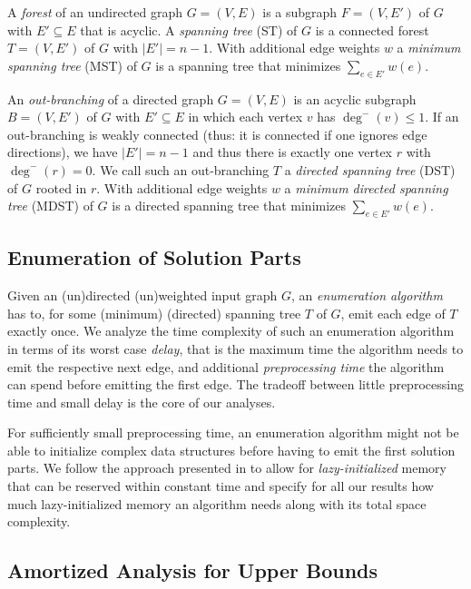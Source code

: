 \documentclass[a4paper, USenglish, cleveref, autoref, thm-restate]{lipics-v2021}
\newcommand{\indeg}{\deg^-}
\begin{document}
A \textit{forest} of an undirected graph $G = (V,E)$ is a subgraph $F = (V, E')$ of $G$ with $E' \subseteq E$ that is acyclic.
A \textit{spanning tree} (ST) of $G$ is a connected forest $T = (V, E')$ of $G$ with $|E'| = n-1$.
With additional edge weights $w$ a \textit{minimum spanning tree} (MST) of $G$ is a spanning tree that minimizes $\sum_{e \in E'} w(e)$.

An \textit{out-branching} of a directed graph $G = (V,E)$ is an acyclic subgraph $B = (V, E')$ of $G$ with $E' \subseteq E$  in which each vertex $v$ has $\indeg(v) \leq 1$.
If an out-branching is weakly connected (thus: it is connected if one ignores edge directions), we have $|E'| = n - 1$ and thus there is exactly one vertex $r$ with $\indeg(r) = 0$.
We call such an out-branching $T$ a \textit{directed spanning tree} (DST) of $G$ rooted in $r$.
With additional edge weights $w$ a \textit{minimum directed spanning tree} (MDST) of $G$ is a directed spanning tree that minimizes $\sum_{e \in E'} w(e)$.

\subsection{Enumeration of Solution Parts}

Given an (un)directed (un)weighted input graph $G$, an \textit{enumeration algorithm} has to, for some (minimum) (directed) spanning tree $T$ of $G$, emit each edge of $T$ exactly once.
We analyze the time complexity of such an enumeration algorithm in terms of its worst case \textit{delay}, that is the maximum time the algorithm needs to emit the respective next edge, and additional \textit{preprocessing time} the algorithm can spend before emitting the first edge.
The tradeoff between little preprocessing time and small delay is the core of our analyses.

For sufficiently small preprocessing time, an enumeration algorithm might not be able to initialize complex data structures before having to emit the first solution parts.
We follow the approach presented in \cite{caselShortestDistancesEnumeration2024} to allow for \textit{lazy-initialized} memory that can be reserved within constant time and specify for all our results how much lazy-initialized memory an algorithm needs along with its total space complexity.

\subsection{Amortized Analysis for Upper Bounds}
\label{subsec:upper-techniques}
\end{document}
